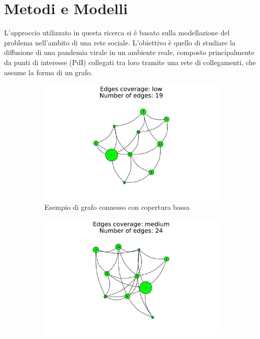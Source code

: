 \section{Metodi e Modelli}

L'approccio utilizzato in questa ricerca si è basato sulla modellazione 
del problema nell'ambito di una rete sociale. L'obiettivo è quello di 
studiare la diffusione di una pandemia virale in un ambiente reale, 
composto principalmente da punti di interesse (PdI) collegati tra loro 
tramite una rete di collegamenti, che assume la forma di un grafo. 

\begin{figure}[!hb]
	\centering
	\begin{subfigure}[b]{0.3\textwidth}
		\centering
		\includegraphics[width=\textwidth]{img/low.pdf}
		\caption{Esempio di grafo connesso con copertura bassa}
		\label{fig:connected_graph_example_low}
	\end{subfigure}
	\hfill
	\begin{subfigure}[b]{0.3\textwidth}
		\centering
		\includegraphics[width=\textwidth]{img/medium.pdf}

\end{subfigure}
\end{figure}
